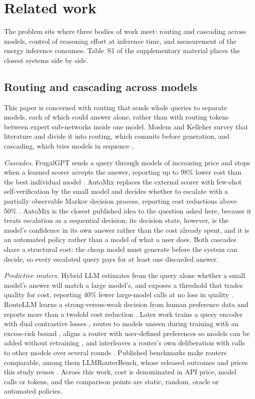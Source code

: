 \section{Related work}
\label{sec:related}

The problem sits where three bodies of work meet: routing and cascading
across models, control of reasoning effort at inference time, and
measurement of the energy inference consumes. Table~S1 of the supplementary
material places the closest systems side by side.

\subsection{Routing and cascading across models}
\label{sec:related-routing}

This paper is concerned with routing that sends whole queries to separate
models, each of which could answer alone, rather than with routing tokens
between expert sub-networks inside one model. Moslem and Kelleher survey that
literature and divide it into routing, which commits before generation, and
cascading, which tries models in sequence \cite{moslem2026routingsurvey}.

\emph{Cascades.} FrugalGPT sends a query through models of increasing price
and stops when a learned scorer accepts the answer, reporting up to 98\%
lower cost than the best individual model \cite{chen2023frugalgpt}. AutoMix
replaces the external scorer with few-shot self-verification by the small
model and decides whether to escalate with a partially observable Markov
decision process, reporting cost reductions above 50\%
\cite{aggarwal2024automix}. AutoMix is the closest published idea to the
question asked here, because it treats escalation as a sequential decision;
its decision state, however, is the model's confidence in its own answer
rather than the cost already spent, and it is an automated policy rather than
a model of what a user does. Both cascades share a structural cost: the cheap
model must generate before the system can decide, so every escalated query
pays for at least one discarded answer.

\emph{Predictive routers.} Hybrid LLM estimates from the query alone whether
a small model's answer will match a large model's, and exposes a threshold
that trades quality for cost, reporting 40\% fewer large-model calls at no
loss in quality \cite{ding2024hybridllm}. RouteLLM learns a strong-versus-weak
decision from human preference data and reports more than a twofold cost
reduction \cite{ong2024routellm}. Later work trains a query encoder
with dual contrastive losses \cite{chen2024routerdc}, routes to models unseen
during training with an excess-risk bound \cite{jitkrittum2025universal},
aligns a router with user-defined preferences so models can be added without
retraining \cite{tran2025archrouter}, and interleaves a router's own
deliberation with calls to other models over several rounds
\cite{zhang2025routerr1}. Published benchmarks make routers comparable, among
them LLMRouterBench, whose released outcomes and prices this study reuses
\cite{li2026llmrouterbench}. Across this work, cost is denominated in API
price, model calls or tokens, and the comparison points are static, random,
oracle or automated policies.

